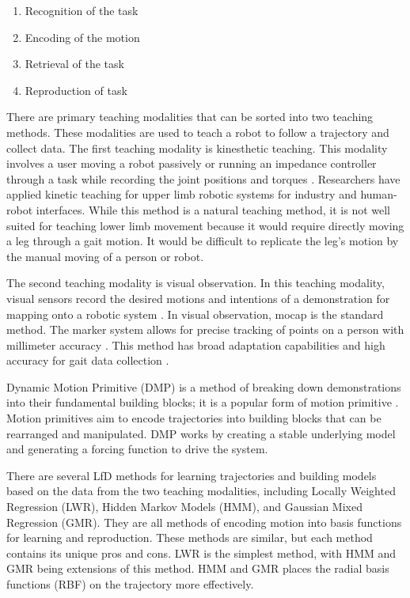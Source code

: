 \begin{enumerate}[noitemsep]
    \item Recognition of the task 
    \item Encoding of the motion 
    \item Retrieval of the task 
    \item Reproduction of task 
\end{enumerate} 

There are primary teaching modalities that can be sorted into two teaching methods. These modalities are used to teach a robot to follow a trajectory and collect data. The first teaching modality is kinesthetic teaching. This modality involves a user moving a robot passively or running an impedance controller through a task while recording the joint positions and torques \cite{Calinon2018}. Researchers have applied kinetic teaching for upper limb robotic systems for industry and human-robot interfaces. While this method is a natural teaching method, it is not well suited for teaching lower limb movement because it would require directly moving a leg through a gait motion. It would be difficult to replicate the leg's motion by the manual moving of a person or robot. 

The second teaching modality is visual observation. In this teaching modality, visual sensors record the desired motions and intentions of a demonstration for mapping onto a robotic system \cite{CalinonLee19}. In visual observation, mocap is the standard method. The marker system allows for precise tracking of points on a person with millimeter accuracy \cite{ott2008motion}. This method has broad adaptation capabilities and high accuracy for gait data collection \cite{ViconGaiting}.

Dynamic Motion Primitive (DMP) is a method of breaking down demonstrations into their fundamental building blocks; it is a popular form of motion primitive \cite{ijspeert2013dynamical}. Motion primitives aim to encode trajectories into building blocks that can be rearranged and manipulated. DMP works by creating a stable underlying model and generating a forcing function to drive the system.  

There are several LfD methods for learning trajectories and building models based on the data from the two teaching modalities, including Locally Weighted Regression (LWR), Hidden Markov Models (HMM), and Gaussian Mixed Regression (GMR). They are all methods of encoding motion into basis functions for learning and reproduction. These methods are similar, but each method contains its unique pros and cons. LWR is the simplest method, with HMM and GMR being extensions of this method. HMM and GMR places the radial basis functions (RBF) on the trajectory more effectively.  

